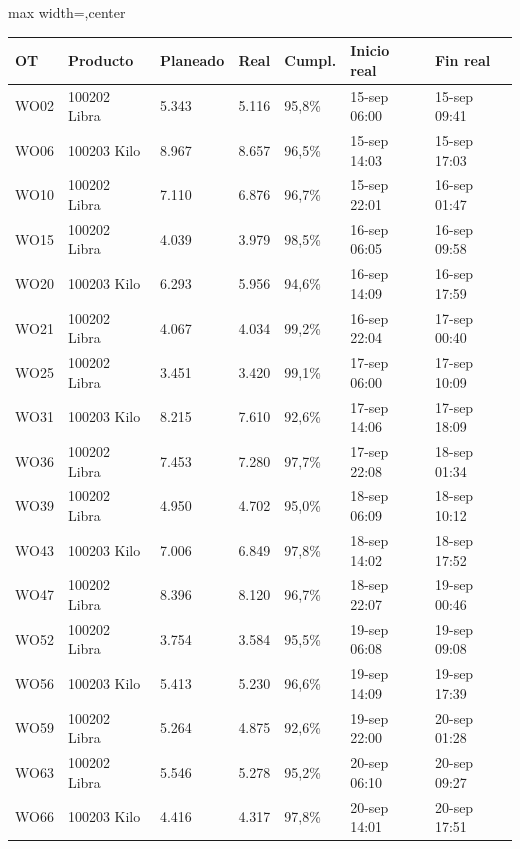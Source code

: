 \begin{singlespace}
{\par\smallskip\noindent\begingroup\footnotesize\setlength{\tabcolsep}{3.5pt}\renewcommand{\arraystretch}{1.18}
\begin{adjustbox}{max width=\linewidth,center}\begin{tabular}{@{}lllllll@{}}
\toprule
\rowcolor{tblhead}\textbf{OT} & \textbf{Producto} & \textbf{Planeado} & \textbf{Real} & \textbf{Cumpl.} & \textbf{Inicio real} & \textbf{Fin real} \\
\midrule
WO02 & 100202 Libra & 5.343 & 5.116 & 95,8\% & 15-sep 06:00 & 15-sep 09:41 \\
\rowcolor{tblzebra}WO06 & 100203 Kilo & 8.967 & 8.657 & 96,5\% & 15-sep 14:03 & 15-sep 17:03 \\
WO10 & 100202 Libra & 7.110 & 6.876 & 96,7\% & 15-sep 22:01 & 16-sep 01:47 \\
\rowcolor{tblzebra}WO15 & 100202 Libra & 4.039 & 3.979 & 98,5\% & 16-sep 06:05 & 16-sep 09:58 \\
WO20 & 100203 Kilo & 6.293 & 5.956 & 94,6\% & 16-sep 14:09 & 16-sep 17:59 \\
\rowcolor{tblzebra}WO21 & 100202 Libra & 4.067 & 4.034 & 99,2\% & 16-sep 22:04 & 17-sep 00:40 \\
WO25 & 100202 Libra & 3.451 & 3.420 & 99,1\% & 17-sep 06:00 & 17-sep 10:09 \\
\rowcolor{tblzebra}WO31 & 100203 Kilo & 8.215 & 7.610 & 92,6\% & 17-sep 14:06 & 17-sep 18:09 \\
WO36 & 100202 Libra & 7.453 & 7.280 & 97,7\% & 17-sep 22:08 & 18-sep 01:34 \\
\rowcolor{tblzebra}WO39 & 100202 Libra & 4.950 & 4.702 & 95,0\% & 18-sep 06:09 & 18-sep 10:12 \\
WO43 & 100203 Kilo & 7.006 & 6.849 & 97,8\% & 18-sep 14:02 & 18-sep 17:52 \\
\rowcolor{tblzebra}WO47 & 100202 Libra & 8.396 & 8.120 & 96,7\% & 18-sep 22:07 & 19-sep 00:46 \\
WO52 & 100202 Libra & 3.754 & 3.584 & 95,5\% & 19-sep 06:08 & 19-sep 09:08 \\
\rowcolor{tblzebra}WO56 & 100203 Kilo & 5.413 & 5.230 & 96,6\% & 19-sep 14:09 & 19-sep 17:39 \\
WO59 & 100202 Libra & 5.264 & 4.875 & 92,6\% & 19-sep 22:00 & 20-sep 01:28 \\
\rowcolor{tblzebra}WO63 & 100202 Libra & 5.546 & 5.278 & 95,2\% & 20-sep 06:10 & 20-sep 09:27 \\
WO66 & 100203 Kilo & 4.416 & 4.317 & 97,8\% & 20-sep 14:01 & 20-sep 17:51 \\

\end{tabular}
\end{adjustbox}}
\end{singlespace}
